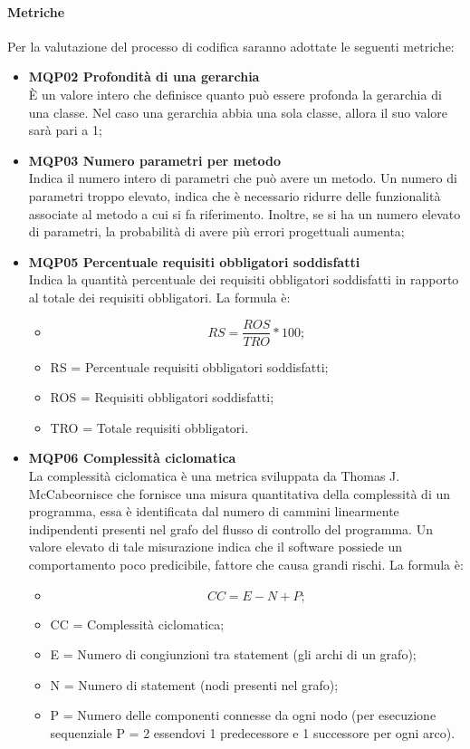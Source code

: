 \paragraph{Metriche}
Per la valutazione del processo di codifica saranno adottate le seguenti metriche:
\begin{itemize}

\item \textbf{MQP02 Profondità di una gerarchia} \\
È un valore intero che definisce quanto può essere profonda la gerarchia di una classe. Nel caso una gerarchia abbia una sola classe, allora il suo valore sarà pari a 1;

\item \textbf{MQP03 Numero parametri per metodo} \\
Indica il numero intero di parametri che può avere un metodo. Un numero di parametri troppo elevato, indica che è necessario ridurre delle funzionalità associate al metodo a cui si fa riferimento. Inoltre, se si ha un numero elevato di parametri, la probabilità di avere più errori progettuali aumenta;

\item \textbf{MQP05 Percentuale requisiti obbligatori soddisfatti} \\
Indica la quantità percentuale dei requisiti obbligatori soddisfatti in rapporto al totale dei requisiti obbligatori.
La formula è:
\begin{itemize}
  \item[] \[RS = \frac{ROS}{TRO} * 100;\]
  \item RS = Percentuale requisiti obbligatori soddisfatti;
  \item ROS = Requisiti obbligatori soddisfatti;
  \item TRO = Totale requisiti 	obbligatori.
  \end{itemize}

\item \textbf{MQP06 Complessità ciclomatica}\\
La complessità ciclomatica è una metrica sviluppata da Thomas J. McCabeornisce che fornisce una misura quantitativa della complessità di un programma, essa è identificata dal numero di cammini linearmente indipendenti presenti nel grafo del flusso di controllo del programma. Un valore elevato di tale misurazione indica che il software possiede un comportamento poco predicibile, fattore che causa grandi rischi.
La formula è:
\begin{itemize}
  \item[] \[CC 	= E - N + P;\]
  \item CC = Complessità ciclomatica;
  \item E = Numero di congiunzioni tra statement (gli archi di un grafo);
  \item N = Numero di statement (nodi presenti nel grafo);
  \item P = Numero delle componenti connesse da ogni nodo (per esecuzione sequenziale P = 2 essendovi 1 predecessore e 1 successore per ogni arco).
  \end{itemize}



\end{itemize}
